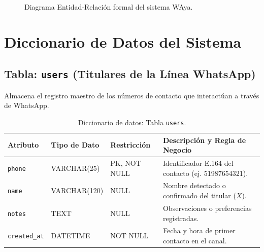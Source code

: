\documentclass[12pt,a4paper]{report}
\begin{document}
\begin{figure}[h!]
\caption{Diagrama Entidad-Relación formal del sistema WAya.}
\label{fig:mer_detallado}
\end{figure}

\section{Diccionario de Datos del Sistema}

\subsection{Tabla: \texttt{users} (Titulares de la Línea WhatsApp)}
Almacena el registro maestro de los números de contacto que interactúan a través de WhatsApp.
\begin{table}[h!]
\centering
\small
\begin{tabularx}{\textwidth}{|p{2.6cm}|p{2.9cm}|p{2.4cm}|X|}
\hline
\rowcolor{BrandPrimary!20}
\textbf{Atributo} & \textbf{Tipo de Dato} & \textbf{Restricción} & \textbf{Descripción y Regla de Negocio} \\
\hline
\texttt{phone} & VARCHAR(25) & PK, NOT NULL & Identificador E.164 del contacto (ej. 51987654321). \\
\hline
\texttt{name} & VARCHAR(120) & NULL & Nombre detectado o confirmado del titular ($X$). \\
\hline
\texttt{notes} & TEXT & NULL & Observaciones o preferencias registradas. \\
\hline
\texttt{created\_at} & DATETIME & NOT NULL & Fecha y hora de primer contacto en el canal. \\
\hline
\end{tabularx}
\caption{Diccionario de datos: Tabla \texttt{users}.}
\label{tab:dic_users}
\end{table}
\end{document}
